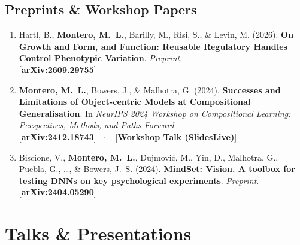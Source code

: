 \documentclass[10pt,a4paper]{article}
\newcommand{\linkbadge}[2]{%
  \textcolor{tagcolor}{[}\href{#2}{\textbf{#1}}\textcolor{tagcolor}{]}%
}
\begin{document}
\subsection*{Preprints \& Workshop Papers}
\begin{enumerate}[leftmargin=1.6em, itemsep=0.45em]
    \item Hartl, B., \textbf{Montero, M.~L.}, Barilly, M., Risi, S., \& Levin, M. (2026). \textbf{On Growth and Form, and Function: Reusable Regulatory Handles Control Phenotypic Variation}. \textit{Preprint}. \\
    \linkbadge{arXiv:2609.29755}{https://arxiv.org/pdf/2609.29755}

    \item \textbf{Montero, M.~L.}, Bowers, J., \& Malhotra, G. (2024). \textbf{Successes and Limitations of Object-centric Models at Compositional Generalisation}. In \textit{NeurIPS 2024 Workshop on Compositional Learning: Perspectives, Methods, and Paths Forward}. \\
    \linkbadge{arXiv:2412.18743}{https://arxiv.org/pdf/2412.18743} \ $\cdot$ \
    \linkbadge{Workshop Talk (SlidesLive)}{https://slideslive.com/39031181/successes-and-limitations-of-objectcentric-models-at-compositional-generalisation?ref=folder-163258}

    \item Biscione, V., \textbf{Montero, M.~L.}, Dujmovi\'{c}, M., Yin, D., Malhotra, G., Puebla, G., \dots, \& Bowers, J.~S. (2024). \textbf{MindSet: Vision. A toolbox for testing DNNs on key psychological experiments}. \textit{Preprint}. \\
    \linkbadge{arXiv:2404.05290}{https://arxiv.org/pdf/2404.05290}
\end{enumerate}

\section*{Talks \& Presentations}
\end{document}
